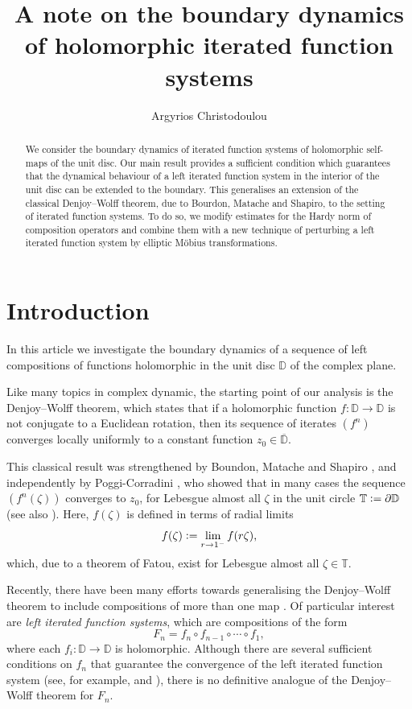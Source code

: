 \documentclass[11pt, reqno]{amsart}
\title[Boundary dynamics of iterated function systems]{A note on the boundary dynamics of holomorphic iterated function systems}
\author{Argyrios Christodoulou}
\theoremstyle{definition}
\numberwithin{equation}{section}
\newcommand{\D}{\mathbb{D}}
\newcommand{\T}{\mathbb{T}}
\begin{document}
\maketitle

\begin{abstract}
We consider the boundary dynamics of iterated function systems of holomorphic self-maps of the unit disc. Our main result provides a sufficient condition which guarantees that the dynamical behaviour of a left iterated function system in the interior of the unit disc can be extended to the boundary. This generalises an extension of the classical Denjoy--Wolff theorem, due to Bourdon, Matache and Shapiro, to the setting of iterated function systems. To do so, we modify estimates for the Hardy norm of composition operators and combine them with a new technique of perturbing a left iterated function system by elliptic M\"obius transformations.
\end{abstract}

\section{Introduction}
In this article we investigate the boundary dynamics of a sequence of left compositions of functions holomorphic in the unit disc $\D$ of the complex plane.

Like many topics in complex dynamic, the starting point of our analysis is the Denjoy--Wolff theorem, which states that if a holomorphic function $f\colon \D \to\D$ is not conjugate to a Euclidean rotation, then its sequence of iterates $(f^n)$ converges locally uniformly to a constant function $z_0\in\overline{\D}$.

This classical result was strengthened by Boundon, Matache and Shapiro \cite{BoMaSh2005}, and independently by Poggi-Corradini \cite{Po2010}, who showed that in many cases the sequence $(f^n(\zeta))$ converges to $z_0$, for Lebesgue almost all $\zeta$ in the unit circle $\T\vcentcolon=\partial\D$ (see also \cite{DoMa1991}). Here, $f(\zeta)$ is defined in terms of radial limits
\[
f(\zeta)\vcentcolon=\lim_{r\to1^-}f(r\zeta),
\]
which, due to a theorem of Fatou, exist for Lebesgue almost all $\zeta\in\T$.

Recently, there have been many efforts towards generalising the Denjoy--Wolff theorem to include compositions of more than one map \cite{AbSh2025, BEFRS1, BEFRS2, Fe2023, FeNi2025}. Of particular interest are \emph{left iterated function systems}, which are compositions of the form
\[
F_n=f_n\circ f_{n-1} \circ\cdots \circ f_1,
\]
where each $f_i\colon\D\to\D$ is holomorphic. Although there are several sufficient conditions on $f_n$ that guarantee the convergence of the left iterated function system (see, for example, \cite{AbCh2022, AbSh2025, ChSh2019} and \cite[Sections 3.6, 3.7]{Ab2023}), there is no definitive analogue of the Denjoy--Wolff theorem for $F_n$.
\end{document}
